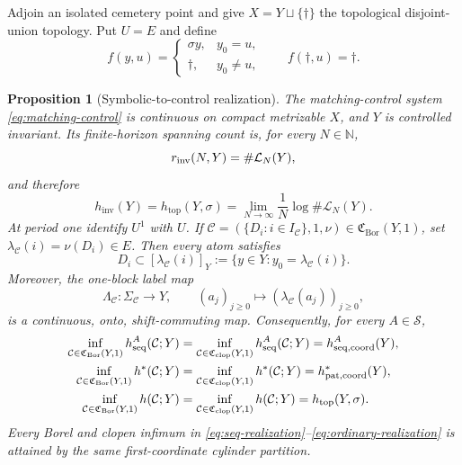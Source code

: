 \documentclass[11pt,reqno]{amsart}
\numberwithin{equation}{section}
\newtheorem{proposition}[theorem]{Proposition}
\theoremstyle{definition}
\theoremstyle{definition}
\newcommand{\N}{\mathbb N}
\newcommand{\C}{\mathcal C}
\newcommand{\Lcal}{\mathcal L}
\newcommand{\hseq}{h_{\mathrm{seq}}}
\newcommand{\hpat}{h^{*}}
\newcommand{\hinv}{h_{\mathrm{inv}}}
\newcommand{\htop}{h_{\mathrm{top}}}
\newcommand{\Bor}{\mathrm{Bor}}
\newcommand{\clop}{\mathrm{clop}}
\begin{document}
Adjoin an isolated cemetery point and give
$X=Y\sqcup\{\dagger\}$ the topological disjoint-union topology.  Put $U=E$
and define
\begin{equation}\label{eq:matching-control}
 f(y,u)=
 \begin{cases}
   \sigma y,&y_0=u,\\
   \dagger,&y_0\ne u,
 \end{cases}
 \qquad
 f(\dagger,u)=\dagger.
\end{equation}

\begin{proposition}[Symbolic-to-control realization]\label{thm:C}
The matching-control system \eqref{eq:matching-control} is continuous
on compact metrizable $X$, and $Y$ is controlled invariant. Its
finite-horizon spanning count is, for every $N\in\N$,
\begin{equation}\label{eq:rinv-language}
 r_{\rm inv}(N,Y)=\#\Lcal_N(Y),
\end{equation}
and therefore
\begin{equation}\label{eq:hinv-htop}
 \hinv(Y)=\htop(Y,\sigma)
 =\lim_{N\to\infty}\frac1N\log\#\Lcal_N(Y).
\end{equation}
At period one identify $U^1$ with $U$. If
$\C=(\{D_i:i\in I_\C\},1,\nu)\in\mathfrak C_{\Bor}(Y,1)$, set
$\lambda_\C(i)=\nu(D_i)\in E$.  Then every atom satisfies
\begin{equation}\label{eq:atom-cylinder}
 D_i\subset[\lambda_\C(i)]_Y
 :=\{y\in Y:y_0=\lambda_\C(i)\}.
\end{equation}
Moreover, the one-block label map
\begin{equation}\label{eq:label-factor}
 \Lambda_\C:\Sigma_\C\longrightarrow Y,
 \qquad (a_j)_{j\ge0}\longmapsto(\lambda_\C(a_j))_{j\ge0},
\end{equation}
is a continuous, onto, shift-commuting map.
Consequently, for every $A\in\mathscr S$,
\begin{align}
 \inf_{\C\in\mathfrak C_{\Bor}(Y,1)}\hseq^A(\C;Y)
 &=\inf_{\C\in\mathfrak C_{\clop}(Y,1)}\hseq^A(\C;Y)
 =h_{\rm seq,coord}^A(Y),
 \label{eq:seq-realization}\\
 \inf_{\C\in\mathfrak C_{\Bor}(Y,1)}\hpat(\C;Y)
 &=\inf_{\C\in\mathfrak C_{\clop}(Y,1)}\hpat(\C;Y)
 =h_{\rm pat,coord}^*(Y),
 \label{eq:pat-realization}\\
 \inf_{\C\in\mathfrak C_{\Bor}(Y,1)}h(\C;Y)
 &=\inf_{\C\in\mathfrak C_{\clop}(Y,1)}h(\C;Y)
 =\htop(Y,\sigma).
 \label{eq:ordinary-realization}
\end{align}
Every Borel and clopen infimum in
\eqref{eq:seq-realization}--\eqref{eq:ordinary-realization} is attained by
the same first-coordinate cylinder partition.
\end{proposition}
\end{document}
